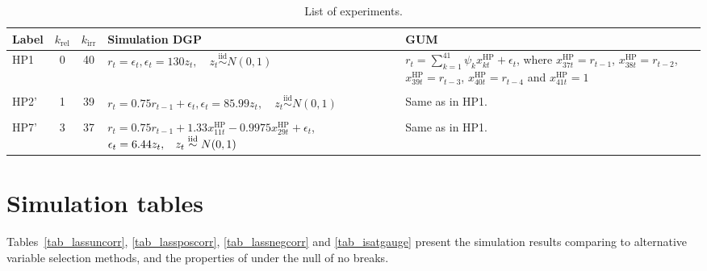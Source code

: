 \documentclass[article,nojss]{jss}
\begin{document}
\begin{table}[t!]
  \centering
  \begin{tabular}{lccll}
    \hline
    Label & $k_{\text{rel}}$ & $k_{\text{irr}}$ & Simulation DGP & GUM \\
    \hline
    HP1 & 0 & 40 & \parbox[t]{.45\linewidth}{ $r_t=\epsilon_t, \\ \epsilon_t = 130z_t, \quad z_t\stackrel{\text{iid}}{\sim} N(0,1)$ } & \parbox[t]{.28\linewidth}{ $r_t =  \sum_{k=1}^{41}\psi_kx_{kt}^{\text{HP}} + \epsilon_t$,\\ where $x_{37t}^{\text{HP}} = r_{t-1}$,\\[2pt]
    $x_{38t}^{\text{HP}} = r_{t-2}$,
    $x_{39t}^{\text{HP}} = r_{t-3}$,\\[2pt]
    $x_{40t}^{\text{HP}} = r_{t-4}$ and
    $x_{41t}^{\text{HP}} = 1$ }\\
          & & & & \\
    HP2' & 1 & 39 & \parbox[t]{.45\linewidth}{ $r_t=0.75r_{t-1} + \epsilon_t, \\ \epsilon_t=85.99z_t, \quad z_t\stackrel{\text{iid}}{\sim} N(0,1)$ } & Same as in HP1. \\
          & & & & \\
    HP7' & 3 & 37 & \parbox[t]{.45\linewidth}{ $r_t = 0.75r_{t-1} + 1.33x_{11t}^{\text{HP}} - 0.9975x_{29t}^{\text{HP}} + \epsilon_t$, \\ $\epsilon_t=6.44z_t,\hspace{3mm}z_t\stackrel{\text{iid}}{\sim} N(0,1)$} & Same as in HP1.\\
    \hline
  \end{tabular}
  \caption{List of experiments.\label{table:list 1 of experiments} }
\end{table}
	
\section{Simulation tables}\label{sec:simulation-tables}

Tables~\ref{tab_lassuncorr}, \ref{tab_lassposcorr},
\ref{tab_lassnegcorr} and \ref{tab_isatgauge} present the simulation
results comparing  to alternative variable selection
methods, and the properties of  under the null of no
breaks.
\end{document}
